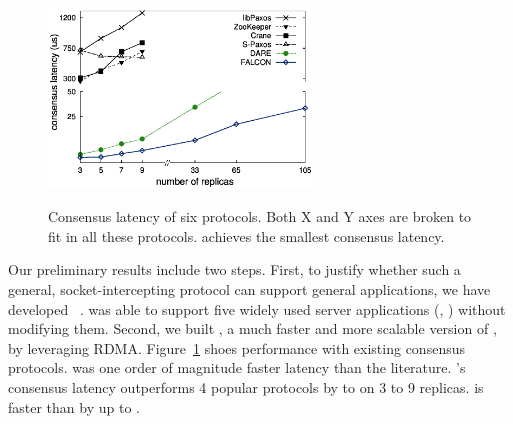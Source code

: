 \begin{figure}
  \vspace{-.1in}
  \includegraphics[width=7cm]{figures/traditional_paxos_latency.ps}\\
  \vspace{-.3in}
  \caption{Consensus latency of six \paxos protocols. Both X and Y axes are 
broken to fit in all these protocols. \falcon achieves the smallest consensus 
latency.}
  \label{fig:scalability}
\end{figure}


 Our preliminary results include two steps. First, 
to justify whether such a general, socket-intercepting protocol can support 
general applications, we have developed \crane~\cite{crane:sosp15}. \crane was 
able to support five widely used server applications (\eg, \mysql) without 
modifying them. Second, we built \falcon, a much faster and more scalable 
version of \crane, by leveraging RDMA. Figure~\ref{fig:scalability} shoes 
\falcon performance with 
existing consensus protocols. \falcon was one order of magnitude faster latency 
than the literature. \falcon's consensus latency outperforms 4 popular \paxos 
protocols by \comptradlow to \comptradhigh on 3 to 9 replicas. \falcon is 
faster than \dare by up to \fasterDARE.



